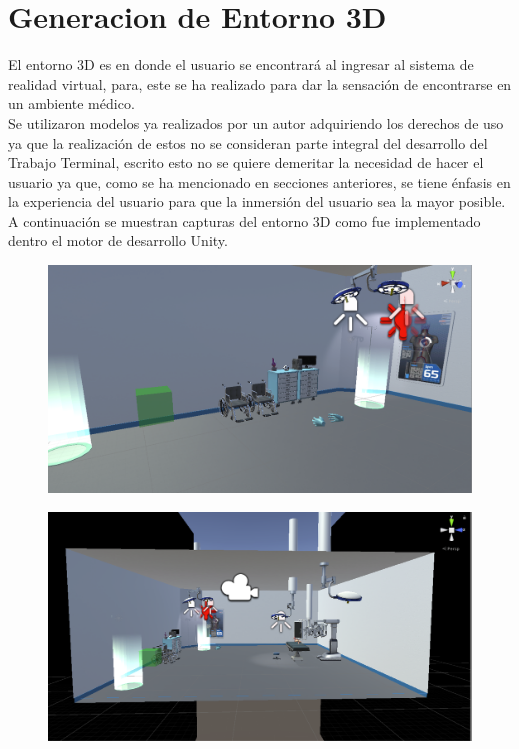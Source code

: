 \section{Generacion de Entorno 3D}
El entorno 3D es en donde el usuario se encontrará al ingresar al sistema de realidad virtual, para, este se ha realizado para dar la sensación de encontrarse en un ambiente médico.\\

Se utilizaron modelos ya realizados por un autor adquiriendo los derechos de uso ya que la realización de estos no se consideran parte integral del desarrollo del Trabajo Terminal, escrito esto no se quiere demeritar la necesidad de hacer el usuario ya que, como se ha mencionado en secciones anteriores, se tiene énfasis en la experiencia del usuario para que la inmersión del usuario sea la mayor posible.\\

A continuación se muestran capturas del entorno 3D como fue implementado dentro el motor de desarrollo Unity.\\

\begin{figure}[H]
	\begin{center}
 		\includegraphics[width = .5\textwidth]{source/images/image63.png}
	\end{center} 
\end{figure}

\begin{figure}[H]
	\begin{center}
 		\includegraphics[width = .5\textwidth]{source/images/image53.png}
	\end{center} 
\end{figure}

